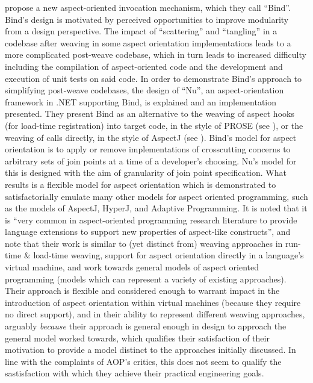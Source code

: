 \citeauthor{rajan2006nu_towardsao_invocation} propose a new aspect-oriented
invocation mechanism, which they call
``Bind''\cite{rajan2006nu_towardsao_invocation}. Bind's design is motivated by
perceived opportunities to improve modularity from a design perspective. The
impact of ``scattering'' and ``tangling'' in a codebase after weaving in some
aspect orientation implementations leads to a more complicated post-weave
codebase, which in turn leads to increased difficulty including the compilation
of aspect-oriented code and the development and execution of unit tests on said
code. In order to demonstrate Bind's approach to simplifying post-weave
codebases, the design of ``Nu'', an aspect-orientation framework in .NET
supporting Bind, is explained and an implementation presented. They present Bind
as an alternative to the weaving of aspect hooks (for load-time registration)
into target code, in the style of PROSE (see
\cite{popovici2002PROSE,popovici2003JITaspects}), or the weaving of calls
directly, in the style of AspectJ (see \cite{aspectj_intro}). Bind's model for
aspect orientation is to apply or remove implementations of crosscutting
concerns to arbitrary sets of join points at a time of a developer's choosing.
Nu's model for this is designed with the aim of granularity of join point
specification. What results is a flexible model for aspect orientation which is
demonstrated to satisfactorially emulate many other models for aspect oriented
programming, such as the models of AspectJ, HyperJ, and Adaptive Programming. It
is noted that it is ``very common in aspect-oriented programming research
literature to provide language extensions to support new properties of
aspect-like constructs'', and note that their work is similar to (yet distinct
from) weaving approaches in run-time \& load-time weaving, support for aspect
orientation directly in a language's virtual machine, and work towards general
models of aspect oriented programming (models which can represent a variety of
existing approaches). Their approach is flexible and considered enough to
warrant impact in the introduction of aspect orientation within virtual machines
(because they require no direct support), and in their ability to represent
different weaving approaches, arguably \emph{because} their approach is general
enough in design to approach the general model worked towards, which qualifies
their satisfaction of their motivation to provide a model distinct to the
approaches initially discussed. In line with the complaints of AOP's critics,
this does not seem to qualify the sastisfaction with which they achieve their
practical engineering goals.

